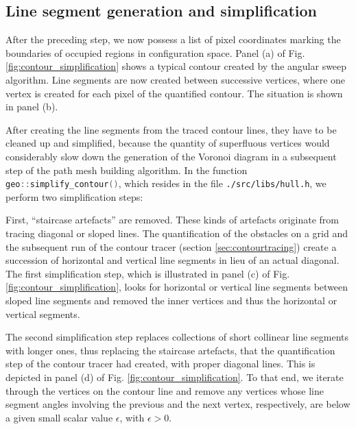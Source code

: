 \subsection{Line segment generation and simplification}
\label{sec:line_seg_generation}
After the preceding step, we now possess a list of pixel coordinates marking the boundaries of occupied regions
in configuration space.
Panel (a) of Fig. \ref{fig:contour_simplification} shows a typical contour created by the angular sweep algorithm.
Line segments are now created between successive vertices, where one vertex is created for each pixel of the
quantified contour. The situation is shown in panel (b).

After creating the line segments from the traced contour lines, they have to be cleaned up and simplified,
because the quantity of superfluous vertices would considerably slow down the generation of the Voronoi 
diagram in a subsequent step of the path mesh building algorithm.
In the function \lstinline[language=C++]|geo::simplify_contour()|, which resides in the file \lstinline|./src/libs/hull.h|,
we perform two simplification steps:

First, ``staircase artefacts'' are removed. These kinds of artefacts originate from tracing diagonal or sloped lines.
The quantification of the obstacles on a grid and the subsequent run of the contour tracer (section \ref{sec:contourtracing})
create a succession of horizontal and vertical line segments in lieu of an actual diagonal.
The first simplification step, which is illustrated in panel (c) of Fig. \ref{fig:contour_simplification}, looks
for horizontal or vertical line segments between sloped line segments and removed the inner vertices and thus the
horizontal or vertical segments.

The second simplification step replaces collections of short collinear line segments with longer ones,
thus replacing the staircase artefacts, that the quantification step of the contour tracer had created,
with proper diagonal lines. This is depicted in panel (d) of Fig. \ref{fig:contour_simplification}.
To that end, we iterate through the vertices on the contour line and remove any vertices whose line segment angles
involving the previous and the next vertex, respectively, are below a given small scalar value $\epsilon$, with $\epsilon > 0$.



